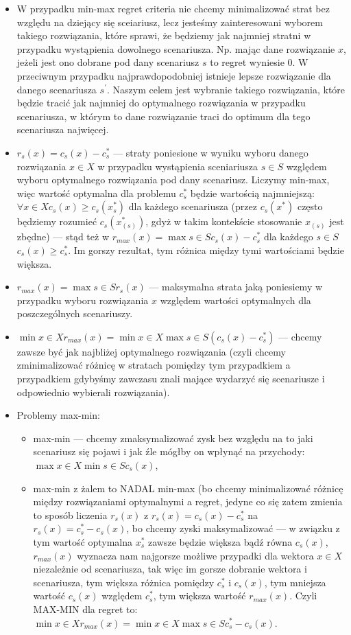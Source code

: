 \begin{itemize}
\begin{itemize}
		\item W przypadku min-max regret criteria nie chcemy minimalizować strat bez względu na dziejący się sceiariusz, lecz jesteśmy zainteresowani wyborem takiego rozwiązania, które sprawi, że będziemy jak najmniej stratni w przypadku wystąpienia dowolnego scenariusza. Np. mając dane rozwiązanie $x$, jeżeli jest ono dobrane pod dany scenariusz $s$ to regret wyniesie 0. W przeciwnym przypadku najprawdopodobniej istnieje lepsze rozwiązanie dla danego scenariusza $s^{\prime}$. Naszym celem jest wybranie takiego rozwiązania, które będzie tracić jak najmniej do optymalnego rozwiązania w przypadku scenariusza, w którym to dane rozwiązanie traci do optimum dla tego scenariusza najwięcej.
		\item $r_s(x) = c_s(x) - c_s^\ast$ --- straty poniesione w wyniku wyboru danego rozwiązania $x \in X$ w przypadku wystąpienia sceniariusza $s \in S$ względem wyboru optymalnego rozwiązania pod dany scenariusz. Liczymy min-max, więc wartość optymalna dla problemu $c_s^\ast$ będzie wartością najmniejszą: $\forall x \in X c_s(x) \geqslant c_s(x_s^\ast)$ dla każdego scenariusza (przez $c_s(x^\ast)$ często będziemy rozumieć $c_s(x^\ast_{\left( s \right)})$, gdyż w takim kontekście stosowanie $x_{\left( s \right)}$ jest zbędne) --- stąd też w $r_{max}(x) = \max{s \in S} c_s(x) - c_s^\ast$ dla każdego $s \in S$ $c_s(x) \geqslant c_s^\ast$. Im gorszy rezultat, tym różnica między tymi wartościami będzie większa.
		\item $r_{max}(x) = \max{s \in S} r_s(x)$ --- maksymalna strata jaką poniesiemy w przypadku wyboru rozwiązania $x$ względem wartości optymalnych dla poszczególnych scenariuszy.
		\item $\min{x \in X} r_{max}(x) = \min{x \in X} \max{s \in S} (c_s(x) - c_s^\ast)$ --- chcemy zawsze być jak najbliżej optymalnego rozwiązania (czyli chcemy zminimalizować różnicę w stratach pomiędzy tym przypadkiem a przypadkiem gdybyśmy zawczasu znali mające wydarzyć się scenariusze i odpowiednio wybierali rozwiązania).
		\item Problemy max-min:
		\begin{itemize}
			\item max-min --- chcemy zmaksymalizować zysk bez względu na to jaki scenariusz się pojawi i jak źle mógłby on wpłynąć na przychody: $\max{x \in X} \min{s \in S} c_s(x)$,
			\item max-min z żalem to NADAL min-max (bo chcemy minimalizować różnicę między rozwiązaniami optymalnymi a regret, jedyne co się zatem zmienia to sposób liczenia $r_s(x)$ z $r_s(x) = c_s(x) - c_s^\ast$ na $r_s(x) = c_s^\ast - c_s(x)$, bo chcemy zyski maksymalizować --- w związku z tym wartość optymalna $x_s^\ast$ zawsze będzie większa bądź równa $c_s(x)$, $r_{max}(x)$ wyznacza nam najgorsze możliwe przypadki dla wektora $x \in X$ niezależnie od scenariusza, tak więc im gorsze dobranie wektora i scenariusza, tym większa różnica pomiędzy $c_s^\ast$ i $c_s(x)$, tym mniejsza wartość $c_s(x)$ względem $c_s^\ast$, tym większa wartość  $r_{max}(x)$. Czyli  \textsc{MAX-MIN} dla regret to: $\min{x \in X} r_{max}(x) = \min{x \in X} \max{s \in S} c_s^\ast - c_s(x)$.

\end{itemize}
\end{itemize}
\end{itemize}
